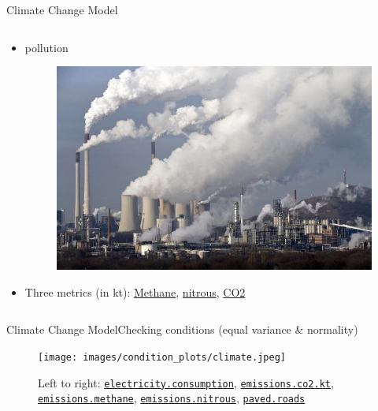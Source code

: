 \documentclass{beamer}
\begin{document}
\begin{frame}{{\sc Climate Change} Model}
\begin{columns}
    \begin{column}{0.5\textwidth}
      \begin{itemize}
      \item pollution
        \begin{figure}
	  \centering
	  \includegraphics[scale=0.2]{images/pollution.jpg}
        \end{figure}
      \item Three metrics (in kt): \href{http://data.worldbank.org/indicator/EN.ATM.METH.KT.CE}{Methane}, \href{http://data.worldbank.org/indicator/EN.ATM.NOXE.KT.CE}{nitrous}, \href{http://data.worldbank.org/indicator/EN.ATM.CO2E.KT}{CO2}
      \end{itemize}
    \end{column}
  \end{columns}
\end{frame}


\begin{frame}{{\sc Climate Change} Model}{Checking conditions (equal variance \& normality)}
    \begin{figure}
      \centering
      \texttt{[image: images/condition\_plots/climate.jpeg]}
      \caption{Left to right: \href{http://data.worldbank.org/indicator/EG.USE.ELEC.KH.PC}{\tt electricity.consumption}, \href{http://data.worldbank.org/indicator/EN.ATM.CO2E.KT}{\tt emissions.co2.kt}, \href{http://data.worldbank.org/indicator/EN.ATM.METH.KT.CE}{\tt emissions.methane}, \href{http://data.worldbank.org/indicator/EN.ATM.NOXE.KT.CE}{\tt emissions.nitrous}, \href{http://data.worldbank.org/indicator/IS.ROD.PAVE.ZS}{\tt paved.roads}}
    \end{figure}
\end{frame}
\end{document}
